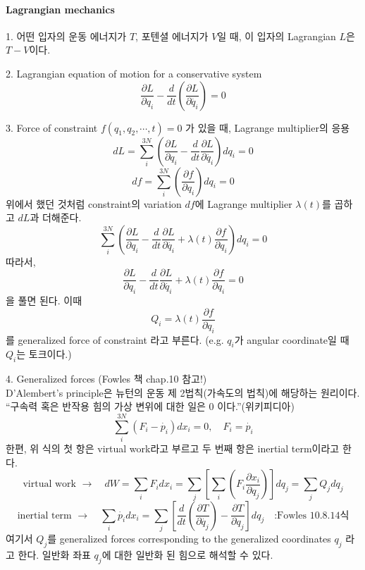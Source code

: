 \documentclass[a4paper,12pt]{article}
\begin{document}
\paragraph{Lagrangian mechanics}
\begin{flushleft}
	1. 어떤 입자의 운동 에너지가 $T$, 포텐셜 에너지가 $V$일 때, 이 입자의 Lagrangian $L$은 $T-V$이다.
\end{flushleft}
\begin{flushleft}
	2. Lagrangian equation of motion for a conservative system
	$$\frac{\partial L}{\partial q_i}-\frac{d}{dt}\left(\frac{\partial L}{\partial \dot{q_i}} \right)=0 $$
\end{flushleft}
\begin{flushleft}
	3. Force of constraint $f(q_1,q_2,\cdots,t)=0$ 가 있을 때, Lagrange multiplier의 응용
	$$
	dL=\sum_{i}^{3N}\left( \frac{\partial L}{\partial q_i}-\frac{d}{dt}\frac{\partial L}{\partial \dot{q_i}}\right)dq_i=0 
	$$
	$$df=\sum_{i}^{3N}\left( \frac{\partial f}{\partial q_i}\right)dq_i=0 $$
	위에서 했던 것처럼 constraint의 variation $df$에 Lagrange multiplier $\lambda(t)$를 곱하고 $dL$과 더해준다.
	$$\sum_{i}^{3N}\left( \frac{\partial L}{\partial q_i}-\frac{d}{dt}\frac{\partial L}{\partial \dot{q_i}}+\lambda(t) \frac{\partial f}{\partial q_i}\right)dq_i=0$$
	따라서,
	$$\frac{\partial L}{\partial q_i}-\frac{d}{dt}\frac{\partial L}{\partial \dot{q_i}}+\lambda(t) \frac{\partial f}{\partial q_i}=0$$
	을 풀면 된다. 이때 
	$$Q_i=\lambda(t)\frac{\partial f}{\partial q_i}$$ 를 generalized force of constraint 라고 부른다. (e.g. $q_i$가 angular coordinate일 때 $Q_i$는 토크이다.) 
\end{flushleft}
\begin{flushleft}
	4. Generalized forces (Fowles 책 chap.10 참고!)\\
	D'Alembert's principle은 뉴턴의 운동 제 2법칙(가속도의 법칙)에 해당하는 원리이다. ``구속력 혹은 반작용 힘의 가상 변위에 대한 일은 0 이다.''(위키피디아)
	$$\sum_{i}^{3N}(F_i-\dot{p_i})dx_i=0, \quad F_i=\dot{p_i}$$
	한편, 위 식의 첫 항은 virtual work라고 부르고 두 번째 항은 inertial term이라고 한다. \\
	$$\mbox{virtual work }\rightarrow\quad dW=\sum_{i}F_idx_i=\sum_{j}\left[\sum_{i}\left( F_i\frac{\partial x_i}{\partial q_j}\right)  \right]dq_j=\sum_{j}Q_jdq_j $$
	$$\mbox{inertial term }\rightarrow\quad \sum_{i}\dot{p_i}dx_i=\sum_{j}\left[\frac{d}{dt}\left(\frac{\partial T}{\partial \dot{q_j}} \right)-\frac{\partial T}{\partial q_j}  \right]dq_j \quad \mbox{:Fowles 10.8.14식} $$
	여기서 $Q_j$를 generalized forces corresponding to the generalized coordinates $q_j$ 라고 한다. 일반화 좌표 $q_j$에 대한 일반화 된 힘으로 해석할 수 있다.
\end{flushleft}
\end{document}
